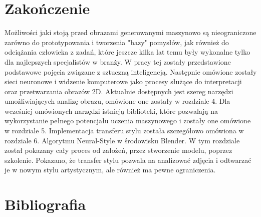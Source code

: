 \documentclass[openright]{xmgr}
\begin{document}
\chapter{Zakończenie}
  \indent \indent Możliwości jaki stoją przed obrazami generowanymi maszynowo są nieograniczone zarówno do prototypowania i tworzenia "bazy" pomysłów, jak również do odciążania człowieka z zadań, które jeszcze kilka lat temu były wykonalne tylko dla najlepszych specjalistów w branży. W pracy tej zostały przedstawione podstawowe pojęcia związane z sztuczną inteligencją. Następnie omówione zostały sieci neuronowe i widzenie komputerowe jako procesy służące do interpretacji oraz przetwarzania obrazów 2D. Aktualnie dostępnych jest szereg narzędzi umożliwiających analizę obrazu, omówione one zostały w rozdziale 4. Dla wcześniej omówionych narzędzi istnieją biblioteki, które pozwalają na wykorzystanie pełnego potencjału uczenia maszynowego i zostały one omówione w rozdziale 5. Implementacja transferu stylu została szczegółowo omówiona w rozdziale 6. Algorytmu Neural-Style  w środowisku Blender. W tym rozdziale został pokazany cały proces od założeń, przez stworzenie modelu, poprzez szkolenie. Pokazano, że transfer stylu pozwala na analizować zdjęcia i odtwarzać je w nowym stylu artystycznym, ale również ma pewne ograniczenia. 


\chapter{Bibliografia}
\end{document}
